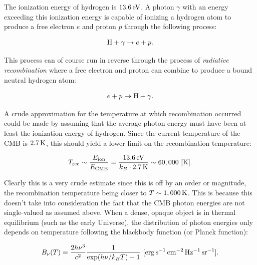 \documentclass[a4paper,11pt]{article}
\begin{document}
{\noindent}The ionization energy of hydrogen is $13.6\,{\rm eV}$. A photon $\gamma$ with an energy exceeding this ionization energy is capable of ionizing a hydrogen atom to produce a free electron $e$ and proton $p$ through the following process:

\begin{align*}
    {\rm H} + \gamma \rightarrow e + p.
\end{align*}

{\noindent}This process can of course run in reverse through the process of \textit{radiative recombination} where a free electron and proton can combine to produce a bound neutral hydrogen atom:

\begin{align*}
    e + p \rightarrow {\rm H} + \gamma.
\end{align*}

{\noindent}A crude approximation for the temperature at which recombination occurred could be made by assuming that the average photon energy must have been at least the ionization energy of hydrogen. Since the current temperature of the CMB is $2.7\,{\rm K}$, this should yield a lower limit on the recombination temperature:

\begin{align*}
    T_\mathrm{rec} \sim \frac{E_\mathrm{ion}}{E_\mathrm{CMB}} = \frac{13.6\,{\rm eV}}{k_B \cdot 2.7\,{\rm K}} \sim 60,000 ~ [{\rm K}].
\end{align*}

{\noindent}Clearly this is a very crude estimate since this is off by an order or magnitude, the recombination temperature being closer to $T \sim 1,000\,{\rm K}$. This is because this doesn't take into consideration the fact that the CMB photon energies are not single-valued as assumed above. When a dense, opaque object is in thermal equilibrium (such as the early Universe), the distribution of photon energies only depends on temperature following the blackbody function (or Planck function):

\begin{align}\label{eq:Planck}
    B_\nu(T) = \frac{2h\nu^3}{c^2} \frac{1}{\exp(h\nu/k_BT) - 1} ~ [{\rm erg\,s^{-1}\,cm^{-2}\,Hz^{-1}\,sr^{-1}}].
\end{align} 
\end{document}
